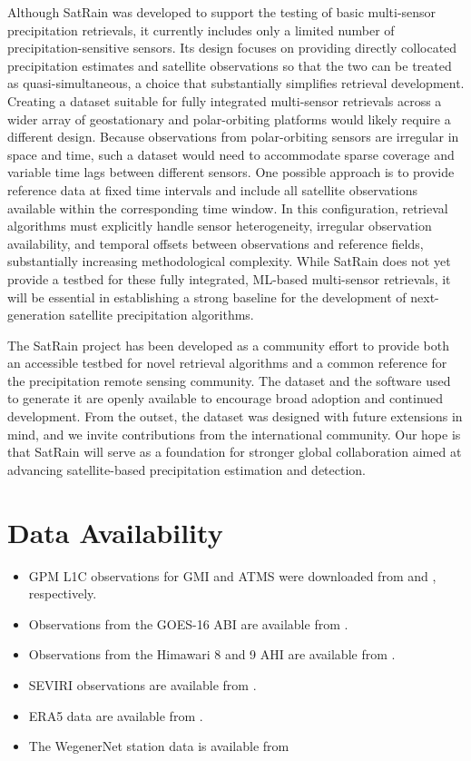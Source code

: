 \documentclass[11pt]{article}
\begin{document}
Although SatRain was developed to support the testing of basic multi-sensor
precipitation retrievals, it currently includes only a limited number of
precipitation-sensitive sensors. Its design focuses on providing directly
collocated precipitation estimates and satellite observations so that the two
can be treated as quasi-simultaneous, a choice that substantially simplifies
retrieval development. Creating a dataset suitable for fully integrated
multi-sensor retrievals across a wider array of geostationary and polar-orbiting
platforms would likely require a different design. Because observations from
polar-orbiting sensors are irregular in space and time, such a dataset would
need to accommodate sparse coverage and variable time lags between different
sensors. One possible approach is to provide reference data at fixed time
intervals and include all satellite observations available within the
corresponding time window. In this configuration, retrieval algorithms must
explicitly handle sensor heterogeneity, irregular observation availability, and
temporal offsets between observations and reference fields, substantially
increasing methodological complexity. While SatRain does not yet provide a
testbed for these fully integrated, ML-based multi-sensor retrievals, it will be
essential in establishing a strong baseline for the development of
next-generation satellite precipitation algorithms.

The SatRain project has been developed as a community effort to provide both an
accessible testbed for novel retrieval algorithms and a common reference for the
precipitation remote sensing community. The dataset and the software used to
generate it are openly available to encourage broad adoption and continued
development. From the outset, the dataset was designed with future extensions in
mind, and we invite contributions from the international community. Our hope is
that SatRain will serve as a foundation for stronger global collaboration aimed
at advancing satellite-based precipitation estimation and detection.

\section*{Data Availability}

\begin{itemize}
\item GPM L1C observations for GMI and ATMS were downloaded from \cite{Berg2022_GMI_L1C_R_V07} and \cite{Berg2022_ATMS_NOAA20_1C_V07}, respectively.
\item Observations from the GOES-16 ABI are available from \cite{NOAA_GOES_AWS}.
\item Observations from the Himawari 8 and 9 AHI are available from \cite{NOAA_HIMAWARI_AWS}.
\item SEVIRI observations are available from \cite{EUMETSAT_SEVIRI}.
\item ERA5 data are available from \cite{CDS_ERA5}.
\item The WegenerNet station data is available from \cite{WegenerNet2025}
\end{itemize}
\end{document}
